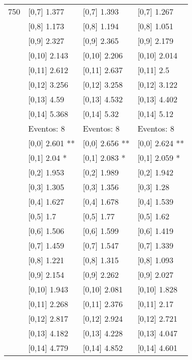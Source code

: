 \begin{table}
\begin{tabular}[t]{llll}
750 & {}[0,7] 1.377 & {}[0,7] 1.393 & {}[0,7] 1.267\\
\addlinespace
 & {}[0,8] 1.173 & {}[0,8] 1.194 & {}[0,8] 1.051\\
 & {}[0,9] 2.327 & {}[0,9] 2.365 & {}[0,9] 2.179\\
 & {}[0,10] 2.143 & {}[0,10] 2.206 & {}[0,10] 2.014\\
 & {}[0,11] 2.612 & {}[0,11] 2.637 & {}[0,11] 2.5\\
 & {}[0,12] 3.256 & {}[0,12] 3.258 & {}[0,12] 3.122\\
\addlinespace
 & {}[0,13] 4.59 & {}[0,13] 4.532 & {}[0,13] 4.402\\
 & {}[0,14] 5.368 & {}[0,14] 5.32 & {}[0,14] 5.12\\
 & Eventos:  8 & Eventos:  8 & Eventos:  8\\
 & {}[0,0] 2.601 ** & {}[0,0] 2.656 ** & {}[0,0] 2.624 **\\
 & {}[0,1] 2.04 * & {}[0,1] 2.083 * & {}[0,1] 2.059 *\\
\addlinespace
 & {}[0,2] 1.953 & {}[0,2] 1.989 & {}[0,2] 1.942\\
 & {}[0,3] 1.305 & {}[0,3] 1.356 & {}[0,3] 1.28\\
 & {}[0,4] 1.627 & {}[0,4] 1.678 & {}[0,4] 1.539\\
 & {}[0,5] 1.7 & {}[0,5] 1.77 & {}[0,5] 1.62\\
 & {}[0,6] 1.506 & {}[0,6] 1.599 & {}[0,6] 1.419\\
\addlinespace
1000 & {}[0,7] 1.459 & {}[0,7] 1.547 & {}[0,7] 1.339\\
 & {}[0,8] 1.221 & {}[0,8] 1.315 & {}[0,8] 1.093\\
 & {}[0,9] 2.154 & {}[0,9] 2.262 & {}[0,9] 2.027\\
 & {}[0,10] 1.943 & {}[0,10] 2.081 & {}[0,10] 1.828\\
 & {}[0,11] 2.268 & {}[0,11] 2.376 & {}[0,11] 2.17\\
\addlinespace
 & {}[0,12] 2.817 & {}[0,12] 2.924 & {}[0,12] 2.721\\
 & {}[0,13] 4.182 & {}[0,13] 4.228 & {}[0,13] 4.047\\
 & {}[0,14] 4.779 & {}[0,14] 4.852 & {}[0,14] 4.601\\
\bottomrule
\end{tabular}
\end{table}
